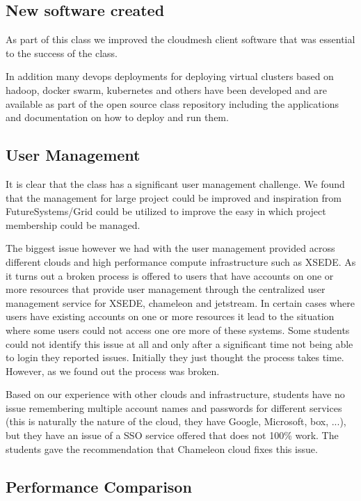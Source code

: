 \documentclass[sigconf]{acmart}
\begin{document}
\subsection{New software created}

As part of this class we improved the cloudmesh client software
\cite{www-cloudmesh-client}\cite{www-cloudmesh-cmd5}
\cite{www-cloudmesh-rest} that was essential to the success of the
class.

In addition many devops deployments for deploying virtual clusters
based on hadoop, docker swarm, kubernetes and others have been
developed and are available as part of the open source class repository
including the applications and documentation on how to deploy and run
them.

\subsection{User Management}

It is clear that the class has a significant user management
challenge. We found that the management for large project could be
improved and inspiration from FutureSystems/Grid could be utilized to
improve the easy in which project membership could be managed.

The biggest issue however we had with the user management provided
across different clouds and high performance compute infrastructure
such as XSEDE. As it turns out a broken process is offered to users
that have accounts on one or more resources that provide user
management through the centralized user management service for XSEDE,
chameleon and jetstream. In certain cases where users have existing
accounts on one or more resources it lead to the situation where some
users could not access one ore more of these systems. Some students
could not identify this issue at all and only after a significant time
not being able to login they reported issues. Initially they just
thought the process takes time. However, as we found out the process
was broken. 

Based on our experience with other clouds and infrastructure, students
have no issue remembering multiple account names and passwords for
different services (this is naturally the nature of the cloud, they
have Google, Microsoft, box, ...), but they have an issue of a SSO
service offered that does not 100\% work. The students gave the
recommendation that Chameleon cloud fixes this issue.

\subsection{Performance Comparison}
\end{document}
